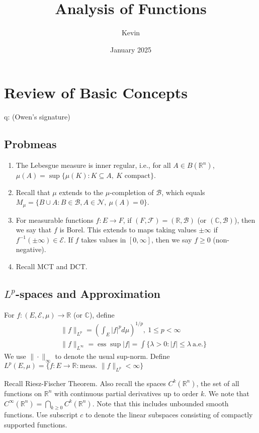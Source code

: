 \documentclass{article}
\title{Analysis of Functions}
\author{Kevin}
\date{January 2025}
\theoremstyle{definition}
\theoremstyle{remark}
\theoremstyle{plain}
\newcommand{\RR}{\mathbb{R}}
\newcommand{\CC}{\mathbb{C}}
\begin{document}
\maketitle
\section{Review of Basic Concepts}
q: (Owen's signature)\\
\subsection{Probmeas}
\begin{enumerate}
    \item The Lebesgue measure is inner regular, i.e., for all $A\in B(\RR^n)$, $\mu(A)=\sup\{\mu(K):K\subseteq A,\ K\text{ compact}\}$.
    \item Recall that $\mu$ extends to the $\mu$-completion of $\mathcal B$, which equals $M_\mu=\{B\cup A: B\in \mathcal B,A\in\mathcal N,\ \mu(A)=0\}$.
    \item For measurable functions $f:E\to F$, if $(F,\mathcal F)=(\RR,\mathcal B)$ (or $(\CC,\mathcal B)$), then we say that $f$ is Borel. This extends to maps taking values $\pm\infty$ if $f^{-1}({\pm\infty})\in\mathcal E$. If $f$ takes values in $[0,\infty]$, then we say $f\ge 0$ (non-negative).
    \item Recall MCT and DCT.
\end{enumerate}
\subsection{$L^p$-spaces and Approximation}
For $f:(E,\mathcal E,\mu)\to \RR$ (or $\CC$), define
\begin{align*}
    &\|f\|_{L^p}=\left(\int_E |f|^pd\mu\right)^{1/p},\ 1\le p<\infty\\
    &\|f\|_{L^\infty}=\operatorname{ess}\sup|f|=\int\{\lambda>0:|f|\le \lambda\ \text{a.e.}\}
\end{align*}
We use $\|\cdot\|_\infty$ to denote the usual sup-norm. Define $L^p(E,\mu)=\{f:E\to\RR:\text{meas. }\|f\|_{L^p}<\infty\}$

Recall Riesz-Fischer Theorem. Also recall the spaces $C^k(\RR^n)$, the set of all functions on $\RR^n$ with continuous partial derivatives up to order $k$. We note that $C^\infty(\RR^n)=\bigcap_{k\ge 0}C^k(\RR^n)$. Note that this includes unbounded smooth functions. Use subscript $c$ to denote the linear subspaces consisting of compactly supported functions.
\end{document}
